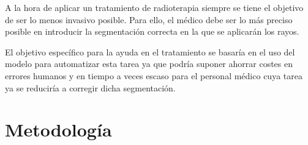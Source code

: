 A la hora de aplicar un tratamiento de radioterapia siempre se tiene el objetivo de ser lo menos invasivo posible. Para ello, el médico debe ser lo más preciso posible en introducir la segmentación correcta en la que se aplicarán los rayos. 

El objetivo específico para la ayuda en el tratamiento se basaría en el uso del modelo para automatizar esta tarea ya que podría suponer ahorrar costes en errores humanos y en tiempo a veces escaso para el personal médico cuya tarea ya se reduciría a corregir dicha segmentación.
 




\section{Metodología}
